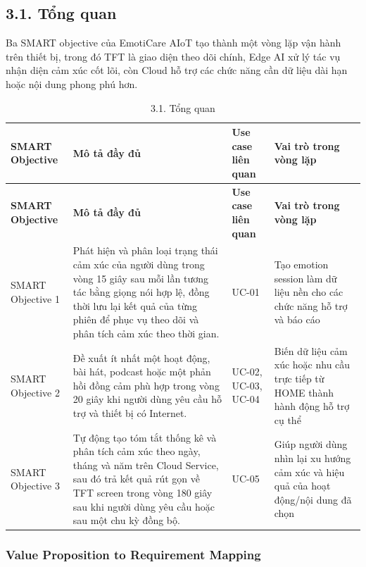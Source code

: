 \documentclass[12pt,a4paper]{article}
\begin{document}
\subsection*{3.1. Tổng quan}

Ba SMART objective của EmotiCare AIoT tạo thành một vòng lặp vận hành trên thiết bị, trong đó TFT là giao diện theo dõi chính, Edge AI xử lý tác vụ nhận diện cảm xúc cốt lõi, còn Cloud hỗ trợ các chức năng cần dữ liệu dài hạn hoặc nội dung phong phú hơn.


\begin{center}
\scriptsize
\begin{longtable}{|P{0.18\textwidth}|P{0.25\textwidth}|P{0.25\textwidth}|P{0.22\textwidth}|}
\caption{3.1. Tổng quan}\\
\hline
\textbf{SMART Objective} & \textbf{Mô tả đầy đủ} & \textbf{Use case liên quan} & \textbf{Vai trò trong vòng lặp} \\
\hline
\endfirsthead
\hline
\textbf{SMART Objective} & \textbf{Mô tả đầy đủ} & \textbf{Use case liên quan} & \textbf{Vai trò trong vòng lặp} \\
\hline
\endhead
SMART Objective 1 & Phát hiện và phân loại trạng thái cảm xúc của người dùng trong vòng 15 giây sau mỗi lần tương tác bằng giọng nói hợp lệ, đồng thời lưu lại kết quả của từng phiên để phục vụ theo dõi và phân tích cảm xúc theo thời gian. & UC-01 & Tạo emotion session làm dữ liệu nền cho các chức năng hỗ trợ và báo cáo \\
\hline
SMART Objective 2 & Đề xuất ít nhất một hoạt động, bài hát, podcast hoặc một phản hồi đồng cảm phù hợp trong vòng 20 giây khi người dùng yêu cầu hỗ trợ và thiết bị có Internet. & UC-02, UC-03, UC-04 & Biến dữ liệu cảm xúc hoặc nhu cầu trực tiếp từ HOME thành hành động hỗ trợ cụ thể \\
\hline
SMART Objective 3 & Tự động tạo tóm tắt thống kê và phân tích cảm xúc theo ngày, tháng và năm trên Cloud Service, sau đó trả kết quả rút gọn về TFT screen trong vòng 180 giây sau khi người dùng yêu cầu hoặc sau một chu kỳ đồng bộ. & UC-05 & Giúp người dùng nhìn lại xu hướng cảm xúc và hiệu quả của hoạt động/nội dung đã chọn \\
\hline
\end{longtable}
\normalsize
\end{center}

\subsubsection*{Value Proposition to Requirement Mapping}
\end{document}
